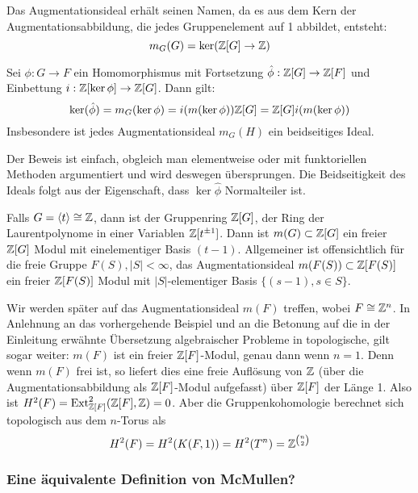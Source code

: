 \begin{bem}
Das Augmentationsideal erhält seinen Namen, da es aus dem Kern der Augmentationsabbildung, die jedes Gruppenelement auf 1 abbildet, entsteht:
\[
	m_G(G) = \ker(\mathbb{Z}[G] \to \mathbb{Z})
\]

\end{bem}
\begin{lem}
\label{lem:augmker}
	Sei $\phi:G \to F$ ein Homomorphismus mit Fortsetzung $\hat \phi: \mathbb{Z}[G] \to \mathbb{Z}[F]$ und Einbettung $i:\mathbb{Z}[\ker\phi] \to \mathbb{Z}[G]$. Dann gilt:
	\[
		\ker(\hat\phi) = m_G(\ker\phi)= i(m(\ker\phi)) \mathbb{Z}[G] = \mathbb{Z}[G] i(m(\ker\phi)) 
	\]
	Insbesondere ist jedes Augmentationsideal $m_G(H)$ ein beidseitiges Ideal.
\end{lem}
Der Beweis ist einfach, obgleich man elementweise oder mit funktoriellen Methoden argumentiert und wird deswegen übersprungen. Die Beidseitigkeit des Ideals folgt aus der Eigenschaft, dass $\ker\hat\phi$ Normalteiler ist.


\begin{bsp}
	Falls $G=\langle t \rangle \cong \mathbb{Z}$, dann ist der Gruppenring $\mathbb{Z} [G]$, der Ring der Laurentpolynome in einer Variablen $\mathbb{Z}[t^{\pm 1}]$. Dann ist $m(G) \subset \mathbb{Z}[G]$ ein freier $\mathbb{Z}[G]$ Modul mit einelementiger Basis $(t-1)$. Allgemeiner ist offensichtlich für die freie Gruppe $F(S), |S| < \infty$, das Augmentationsideal $m(F(S)) \subset \mathbb{Z}[F(S)]$ ein freier $\mathbb{Z}[F(S)]$ Modul mit $|S|$-elementiger Basis $\{(s-1), s \in S\}$.
\end{bsp}

\begin{bsp}
	\label{ex:eilmaclane}
	Wir werden später auf das Augmentationsideal $m(F)$ treffen, wobei $F\cong \mathbb{Z}^n$. In Anlehnung an das vorhergehende Beispiel und an die Betonung auf die in der Einleitung erwähnte Übersetzung algebraischer Probleme in topologische, gilt sogar weiter: $m(F)$ ist ein freier $\mathbb{Z}[F]$-Modul, genau dann wenn $n=1$. Denn wenn $m(F)$ frei ist, so liefert dies eine freie Auflösung von $\mathbb{Z}$ (über die Augmentationsabbildung als $\mathbb{Z}[F]$-Modul aufgefasst) über $\mathbb{Z}[F]$ der Länge 1. Also ist $H^2(F) = \operatorname{Ext}^2_{\mathbb{Z}[F]}(\mathbb{Z} [F],\mathbb{Z})=0$. Aber die Gruppenkohomologie berechnet sich topologisch aus dem $n$-Torus als 
	\[
	H^2(F)=H^2(K(F,1))=H^2(T^n)=\mathbb{Z}^{\binom n2}		
	\]
\end{bsp}



\subsubsection*{Eine äquivalente Definition von McMullen?}
    
